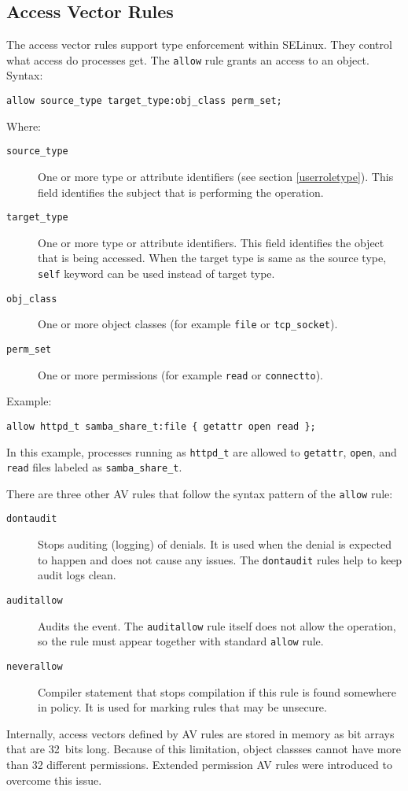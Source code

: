 \subsection{Access Vector Rules}
\label{avrules}
The access vector rules support type enforcement within SELinux. They control
what access do processes get. The \texttt{allow} rule grants an access to an
object. Syntax:
\begin{lstlisting}[language=te]
allow source_type target_type:obj_class perm_set;
\end{lstlisting}
Where:
\begin{description}
    \item [\texttt{source\_type}] One or more type or attribute identifiers (see
        section \ref{userroletype}). This field identifies the subject that is
        performing the operation.
    \item [\texttt{target\_type}] One or more type or attribute identifiers.
        This field identifies the object that is being accessed. When the
        target type is same as the source type, \texttt{self} keyword can be
        used instead of target type.
    \item [\texttt{obj\_class}] One or more object classes (for example
        \texttt{file} or \texttt{tcp\_socket}).
    \item [\texttt{perm\_set}] One or more permissions (for example
        \texttt{read} or \texttt{connectto}).
\end{description}
Example:
\begin{lstlisting}[language=te]
allow httpd_t samba_share_t:file { getattr open read };
\end{lstlisting}
In this example, processes running as \texttt{httpd\_t} are allowed to
\texttt{getattr}, \texttt{open}, and \texttt{read} files labeled as
\texttt{samba\_share\_t}.

There are three other AV rules that follow the syntax pattern of the
\texttt{allow} rule:
\begin{description}
    \item [\texttt{dontaudit}] Stops auditing (logging) of denials. It is used
        when the denial is expected to happen and does not cause any issues. The
        \texttt{dontaudit} rules help to keep audit logs clean.
    \item [\texttt{auditallow}] Audits the event. The \texttt{auditallow} rule
        itself does not allow the operation, so the rule must appear together
        with standard \texttt{allow} rule.
    \item [\texttt{neverallow}] Compiler statement that stops compilation if
        this rule is found somewhere in policy. It is used for marking rules
        that may be unsecure.
\end{description}
Internally, access vectors defined by AV rules are stored in memory as bit
arrays that are 32~bits long. Because of this limitation, object classses cannot
have more than 32 different permissions. Extended permission AV rules were
introduced to overcome this issue.

